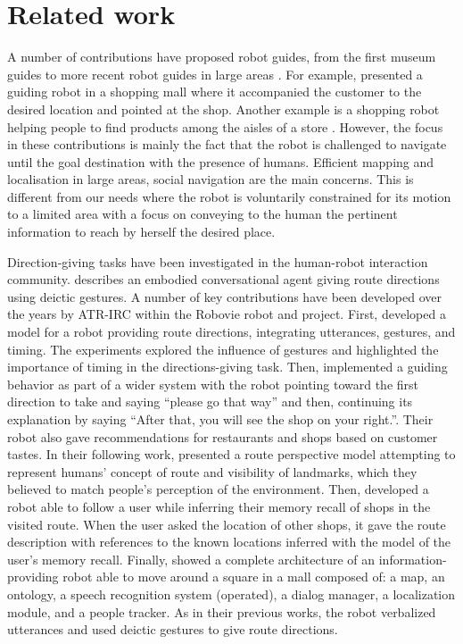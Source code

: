 \documentclass[a4paper,11pt,twoside]{StyleThese}
\begin{document}
\section{Related work}
\label{sec:related-work}

A number of contributions have proposed robot guides, from the first museum guides \cite{burgard_1999_museum, thrun_99, siegwart_2003_robox, clodic_2006_rackham} to more recent robot guides in large areas \cite{bauer_2009_autonomous, triebel_2016_spencer}. For example, \cite{chen_2017_robots} presented a guiding robot in a shopping mall where it accompanied the customer to the desired location and pointed at the shop. Another example is a shopping robot helping people to find products among the aisles of a store \cite{gross_2009_toomas}. 
However, the focus in these contributions is mainly the fact that the robot is challenged to navigate until the goal destination with the presence of humans. Efficient mapping and localisation in large areas, social navigation are the main concerns. This is different from our needs where the robot is voluntarily constrained for its motion to a limited area with a focus on conveying to the human the pertinent information to reach by herself the desired place.

Direction-giving tasks have been investigated in the human-robot interaction community. \cite{kopp_2007} describes an embodied conversational agent giving route directions using deictic gestures. A number of key contributions have been developed over the years by ATR-IRC within the Robovie robot and project.  First, \cite{okuno_2009_providing} developed a model for a robot providing route directions, integrating utterances, gestures, and timing. The experiments explored the influence of gestures and highlighted the importance of timing in the directions-giving task. Then, \cite{kanda_2009_affective, kanda_2010_communication} implemented a guiding behavior as part of a wider system with the robot pointing toward the first direction to take and saying ``please go that way'' and then, continuing its explanation by saying ``After that, you will see the shop on your right.''. Their robot also gave recommendations for restaurants and shops based on customer tastes. In their following work, \cite{morales_2011} presented a route perspective model attempting to represent humans' concept of route and visibility of landmarks, which they believed to match people's perception of the environment. Then, \cite{matsumoto_2012_you} developed a robot able to follow a user while inferring their memory recall of shops in the visited route. When the user asked the location of other shops, it gave the route description with references to the known locations inferred with the model of the user's memory recall. Finally, \cite{satake_2015_should} showed a complete architecture of an information-providing robot able to move around a square in a mall composed of: a map, an ontology, a speech recognition system (operated), a dialog manager, a localization module, and a people tracker. As in their previous works, the robot verbalized utterances and used deictic gestures to give route directions. 
\end{document}
